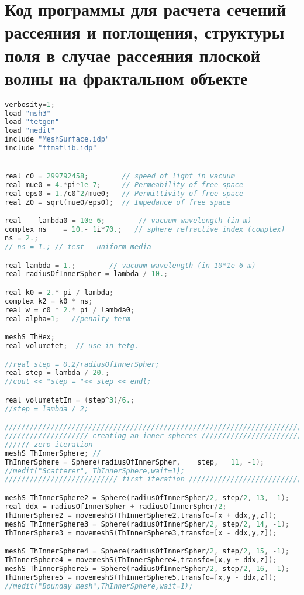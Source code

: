 \chapter{Код программы для расчета сечений рассеяния и поглощения, структуры поля в случае рассеяния плоской волны на фрактальном объекте}

\begin{lstlisting}[language=C]
verbosity=1;
load "msh3"
load "tetgen"
load "medit"
include "MeshSurface.idp"
include "ffmatlib.idp"


real c0 = 299792458;        // speed of light in vacuum
real mue0 = 4.*pi*1e-7;     // Permeability of free space
real eps0 = 1./c0^2/mue0;   // Permittivity of free space
real Z0 = sqrt(mue0/eps0);  // Impedance of free space

real    lambda0 = 10e-6;        // vacuum wavelength (in m)
complex ns    = 10.- 1i*70.;   // sphere refractive index (complex)
ns = 2.;
// ns = 1.; // test - uniform media

real lambda = 1.;        // vacuum wavelength (in 10*1e-6 m)
real radiusOfInnerSpher = lambda / 10.;

real k0 = 2.* pi / lambda;
complex k2 = k0 * ns;
real w = c0 * 2.* pi / lambda0;
real alpha=1; 	//penalty term

meshS ThHex;
real volumetet;  // use in tetg.

//real step = 0.2/radiusOfInnerSpher;
real step = lambda / 20.;
//cout << "step = "<< step << endl;

real volumetetIn = (step^3)/6.;  
//step = lambda / 2;

//////////////////////////////////////////////////////////////////////////
//////////////////// creating an inner spheres ///////////////////////////////////
////// zero iteration
meshS ThInnerSphere; //
ThInnerSphere = Sphere(radiusOfInnerSpher,    step,   11, -1);
//medit("Scatterer", ThInnerSphere,wait=1);
/////////////////////////// first iteration ///////////////////////////////////////////////////

meshS ThInnerSphere2 = Sphere(radiusOfInnerSpher/2, step/2, 13, -1);
real ddx = radiusOfInnerSpher + radiusOfInnerSpher/2;
ThInnerSphere2 = movemeshS(ThInnerSphere2,transfo=[x + ddx,y,z]);
meshS ThInnerSphere3 = Sphere(radiusOfInnerSpher/2, step/2, 14, -1);
ThInnerSphere3 = movemeshS(ThInnerSphere3,transfo=[x - ddx,y,z]);

meshS ThInnerSphere4 = Sphere(radiusOfInnerSpher/2, step/2, 15, -1);
ThInnerSphere4 = movemeshS(ThInnerSphere4,transfo=[x,y + ddx,z]);
meshS ThInnerSphere5 = Sphere(radiusOfInnerSpher/2, step/2, 16, -1);
ThInnerSphere5 = movemeshS(ThInnerSphere5,transfo=[x,y - ddx,z]);
//medit("Bounday mesh",ThInnerSphere,wait=1);



\end{lstlisting}
